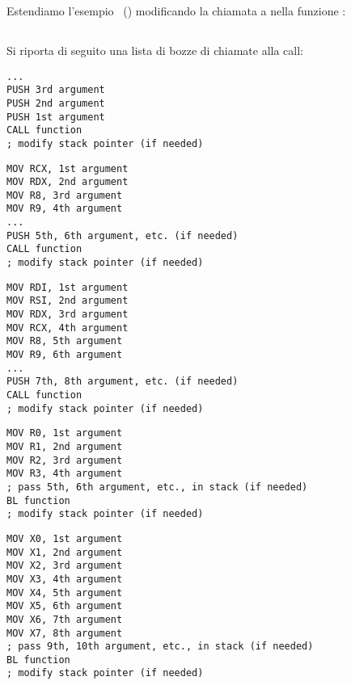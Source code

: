 \mysection{\PrintfSeveralArgumentsSectionName}

Estendiamo l'esempio \IT{\HelloWorldSectionName}~() modificando la chiamata a  \printf nella funzione \main:







\subsection{\Conclusion{}}

Si riporta di seguito una lista di bozze di chiamate alla call:

\begin{lstlisting}[caption=x86,style=customasmx86]
...
PUSH 3rd argument
PUSH 2nd argument
PUSH 1st argument
CALL function
; modify stack pointer (if needed)
\end{lstlisting}

\begin{lstlisting}[caption=x64 (MSVC),style=customasmx86]
MOV RCX, 1st argument
MOV RDX, 2nd argument
MOV R8, 3rd argument
MOV R9, 4th argument
...
PUSH 5th, 6th argument, etc. (if needed)
CALL function
; modify stack pointer (if needed)
\end{lstlisting}

\begin{lstlisting}[caption=x64 (GCC),style=customasmx86]
MOV RDI, 1st argument
MOV RSI, 2nd argument
MOV RDX, 3rd argument
MOV RCX, 4th argument
MOV R8, 5th argument
MOV R9, 6th argument
...
PUSH 7th, 8th argument, etc. (if needed)
CALL function
; modify stack pointer (if needed)
\end{lstlisting}

\begin{lstlisting}[caption=ARM,style=customasmARM]
MOV R0, 1st argument
MOV R1, 2nd argument
MOV R2, 3rd argument
MOV R3, 4th argument
; pass 5th, 6th argument, etc., in stack (if needed)
BL function
; modify stack pointer (if needed)
\end{lstlisting}

\begin{lstlisting}[caption=ARM64,style=customasmARM]
MOV X0, 1st argument
MOV X1, 2nd argument
MOV X2, 3rd argument
MOV X3, 4th argument
MOV X4, 5th argument
MOV X5, 6th argument
MOV X6, 7th argument
MOV X7, 8th argument
; pass 9th, 10th argument, etc., in stack (if needed)
BL function
; modify stack pointer (if needed)
\end{lstlisting}

